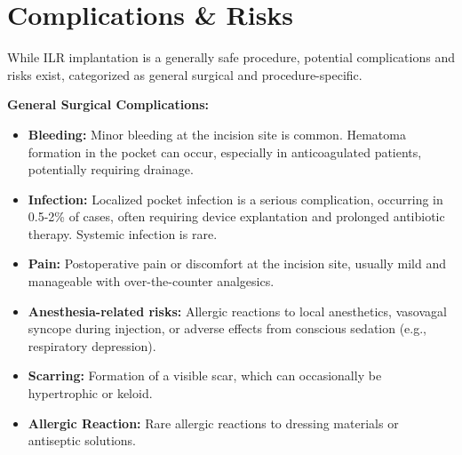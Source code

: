\section*{Complications \& Risks}
While ILR implantation is a generally safe procedure, potential complications and risks exist, categorized as general surgical and procedure-specific.

\textbf{General Surgical Complications:}
\begin{itemize}
  \item \textbf{Bleeding:} Minor bleeding at the incision site is common. Hematoma formation in the pocket can occur, especially in anticoagulated patients, potentially requiring drainage.
  \item \textbf{Infection:} Localized pocket infection is a serious complication, occurring in 0.5-2\% of cases, often requiring device explantation and prolonged antibiotic therapy. Systemic infection is rare.
  \item \textbf{Pain:} Postoperative pain or discomfort at the incision site, usually mild and manageable with over-the-counter analgesics.
  \item \textbf{Anesthesia-related risks:} Allergic reactions to local anesthetics, vasovagal syncope during injection, or adverse effects from conscious sedation (e.g., respiratory depression).
  \item \textbf{Scarring:} Formation of a visible scar, which can occasionally be hypertrophic or keloid.
\item \textbf{Allergic Reaction:} Rare allergic reactions to dressing materials or antiseptic solutions.
\end{itemize}

